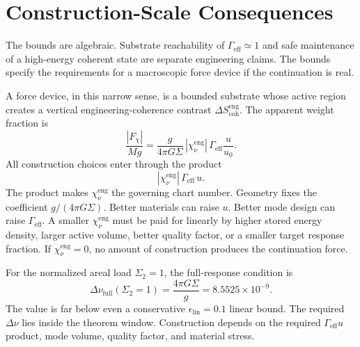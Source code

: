 \documentclass[11pt]{article}
\numberwithin{equation}{section}
\theoremstyle{remark}
\newcommand{\chieng}{\chi_\nu^{\mathrm{eng}}}
\newcommand{\scoheng}{S_{\mathrm{coh}}^{\mathrm{eng}}}
\newcommand{\Gammaeff}{\Gamma_{\mathrm{eff}}}
\begin{document}
\section{Construction-Scale Consequences}

The bounds are algebraic. Substrate reachability of \(\Gammaeff\simeq1\) and
safe maintenance of a high-energy coherent state are separate engineering
claims. The bounds specify the requirements for a macroscopic force device if
the continuation is real.

A force device, in this narrow sense, is a bounded substrate whose active region
creates a vertical engineering-coherence contrast \(\Delta\scoheng\). The apparent weight
fraction is
\begin{equation}
\frac{|F_\chi|}{Mg}
=
\frac{g}{4\pi G\Sigma}\,
|\chieng|\,\Gammaeff\frac{u}{u_0}.
\label{eq:force-fraction}
\end{equation}
All construction choices enter through the product
\begin{equation}
|\chieng|\,\Gammaeff\,u.
\label{eq:construction-product}
\end{equation}
The product makes \(\chieng\) the governing chart number. Geometry fixes the coefficient
\(g/(4\pi G\Sigma)\). Better materials can raise \(u\). Better mode design can
raise \(\Gammaeff\). A smaller \(\chieng\) must be paid for linearly by higher
stored energy density, larger active volume, better quality factor, or a smaller
target response fraction. If \(\chieng=0\), no amount of construction produces the
continuation force.

For the normalized areal load \(\Sigma_2=1\), the full-response condition is
\begin{equation}
\Delta\nu_{\mathrm{full}}(\Sigma_2=1)
=
\frac{4\pi G\Sigma}{g}
=
8.5525\times10^{-9}.
\label{eq:full-response-dnu}
\end{equation}
The value is far below even a conservative \(\epsilon_{\mathrm{lin}}=0.1\) linear
bound. The required \(\Delta\nu\) lies inside the theorem window. Construction
depends on the required \(\Gammaeff u\) product, mode volume, quality factor,
and material stress.
\end{document}
